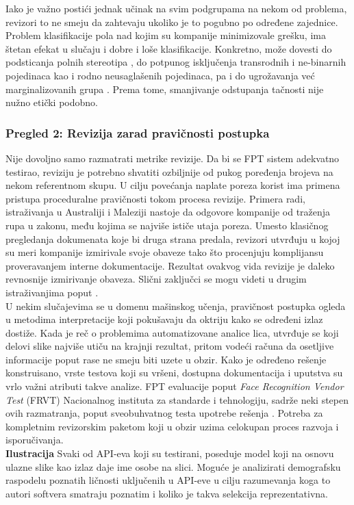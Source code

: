 \documentclass[11pt, a4paper]{article}
\begin{document}
\indent Iako je važno postići jednak učinak na svim podgrupama na nekom od problema, revizori to ne smeju da zahtevaju ukoliko je to pogubno po određene zajednice. Problem klasifikacije pola nad kojim su kompanije minimizovale grešku, ima štetan efekat u slučaju i dobre i loše klasifikacije. Konkretno, može dovesti do podsticanja polnih stereotipa \cite{G19}, do potpunog isključenja transrodnih i ne-binarnih pojedinaca kao i rodno neusaglašenih pojedinaca, pa i do ugrožavanja već marginalizovanih grupa \cite{G22}. Prema tome, smanjivanje odstupanja tačnosti nije nužno etički podobno.

\subsubsection{Pregled 2: Revizija zarad pravičnosti postupka}
Nije dovoljno samo razmatrati metrike revizije. Da bi se FPT sistem adekvatno testirao, reviziju je potrebno shvatiti ozbiljnije od pukog poređenja brojeva na nekom referentnom skupu. U cilju povećanja naplate poreza korist ima primena pristupa proceduralne pravičnosti tokom procesa revizije. Primera radi, istraživanja u Australiji i Maleziji nastoje da odgovore kompanije od traženja rupa u zakonu, među kojima se najviše ističe utaja poreza. Umesto klasičnog pregledanja dokumenata koje bi druga strana predala, revizori utvrđuju u kojoj su meri kompanije izmirivale svoje obaveze \cite{G17, G36} tako što procenjuju komplijansu proveravanjem interne dokumentacije. Rezultat ovakvog vida revizije je daleko revnosnije izmirivanje obaveza. Slični zaključci se mogu videti u drugim istraživanjima poput \cite{G14, G15}. \\
\indent U nekim slučajevima se u domenu mašinskog učenja, pravičnost postupka ogleda u metodima interpretacije koji pokušavaju da oktriju kako se određeni izlaz dostiže. Kada je reč o problemima automatizovane analice lica, utvrđuje se koji delovi slike najviše utiču na krajnji rezultat, pritom vodeći računa da osetljive informacije poput rase ne smeju biti uzete u obzir. Kako je određeno rešenje konstruisano, vrste testova koji su vršeni, dostupna dokumentacija i uputstva su vrlo važni atributi takve analize. FPT evaluacije poput \textit{Face Recognition Vendor Test} (FRVT) Nacionalnog instituta za standarde i tehnologiju, sadrže neki stepen ovih razmatranja, poput sveobuhvatnog testa upotrebe rešenja \cite{G38}. Potreba za kompletnim revizorskim paketom koji u obzir uzima celokupan proces razvoja i isporučivanja. \\
\indent\textbf{Ilustracija} Svaki od API-eva koji su testirani, poseduje model koji na osnovu ulazne slike kao izlaz daje ime osobe na slici. Moguće je analizirati demografsku raspodelu poznatih ličnosti uključenih u API-eve u cilju razumevanja koga to autori softvera smatraju poznatim i koliko je takva selekcija reprezentativna. \\
\end{document}
